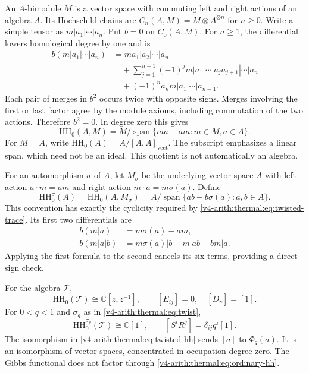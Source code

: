 An $A$-bimodule $M$ is a vector space with commuting left and right
actions of an algebra $A$. Its Hochschild chains are
$C_n(A,M)=M\otimes A^{\otimes n}$ for $n\geq0$. Write a simple
tensor as $m|a_1|\cdots|a_n$. Put $b=0$ on $C_0(A,M)$.
For $n\geq1$, the differential lowers homological degree by one
and is
\begin{align*}
 b(m|a_1|\cdots|a_n)
 &=ma_1|a_2|\cdots|a_n\\
 &\quad+\sum_{j=1}^{n-1}(-1)^j
       m|a_1|\cdots|a_ja_{j+1}|\cdots|a_n\\
 &\quad+(-1)^na_nm|a_1|\cdots|a_{n-1}.
\end{align*}
Each pair of merges in $b^2$ occurs twice with opposite signs.
Merges involving the first or last factor agree by the module
axioms, including commutation of the two actions. Therefore $b^2=0$.
In degree zero this gives
\[
 \mathrm{HH}_0(A,M)=M/\operatorname{span}\{ma-am:m\in M,a\in A\}.
\]
For $M=A$, write $\mathrm{HH}_0(A)=A/[A,A]_{\mathrm{vect}}$.
The subscript emphasizes a linear span, which need not be an ideal.
This quotient is not automatically an algebra.

For an automorphism $\sigma$ of $A$, let $M_\sigma$ be the underlying
vector space $A$ with left action $a\cdot m=am$ and right action
$m\cdot a=m\sigma(a)$. Define
\[
 \mathrm{HH}_0^\sigma(A)=\mathrm{HH}_0(A,M_\sigma)
 =A/\operatorname{span}\{ab-b\sigma(a):a,b\in A\}.
\]
This convention has exactly the cyclicity required by
\eqref{v4-arith:thermal:eq:twisted-trace}. Its first two differentials are
\begin{align*}
 b(m|a)&=m\sigma(a)-am,\\
 b(m|a|b)&=m\sigma(a)|b-m|ab+bm|a.
\end{align*}
Applying the first formula to the second cancels its six terms,
providing a direct sign check.

\begin{theorem}
\label{v4-arith:thermal:thm:hh-quotients}
For the algebra $\mathcal T$,
\begin{equation}
 \mathrm{HH}_0(\mathcal T)\cong\mathbb C[z,z^{-1}],
 \qquad
 [E_{ij}]=0,\quad [D_\gamma]=[1].
 \label{v4-arith:thermal:eq:ordinary-hh}
\end{equation}
For $0<q<1$ and $\sigma_q$ as in \eqref{v4-arith:thermal:eq:twist},
\begin{equation}
 \mathrm{HH}_0^{\sigma_q}(\mathcal T)\cong\mathbb C[1],
 \qquad [S^iR^j]=\delta_{ij}q^i[1].
 \label{v4-arith:thermal:eq:twisted-hh}
\end{equation}
The isomorphism in \eqref{v4-arith:thermal:eq:twisted-hh} sends $[a]$ to $\Phi_q(a)$.
It is an isomorphism of vector spaces, concentrated in occupation
degree zero. The Gibbs functional does not factor through
\eqref{v4-arith:thermal:eq:ordinary-hh}.
\end{theorem}

